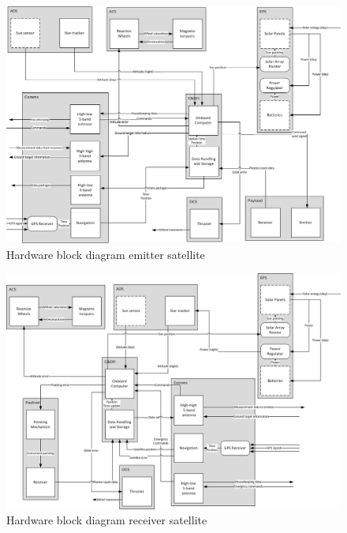 \begin{figure}
\centering
\includegraphics[width=1\textwidth, angle=90]{chapters/img/emitterHWblock.jpg}
\caption{Hardware block diagram emitter satellite}
\label{HWblockemitter}
\end{figure}

\begin{figure}
\centering
\includegraphics[width=1\textwidth, angle=90]{chapters/img/receiverHWblock.jpg}
\caption{Hardware block diagram receiver satellite}
\label{HWblockreceiver}
\end{figure}